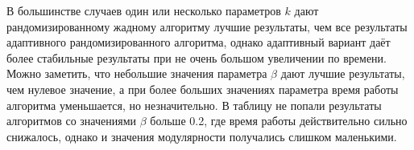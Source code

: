 В большинстве случаев один или несколько параметров $k$ дают рандомизированному жадному алгоритму лучшие результаты, чем все результаты адаптивного рандомизированного алгоритма, однако адаптивный вариант даёт более стабильные результаты при не очень большом увеличении по времени. Можно заметить, что небольшие значения параметра $\beta$ дают лучшие результаты, чем нулевое значение, а при более больших значениях параметра время работы алгоритма уменьшается, но незначительно. В таблицу не попали результаты алгоритмов со значениями $\beta$ больше 0.2, где время работы действительно сильно снижалось, однако и значения модулярности получались слишком маленькими.

